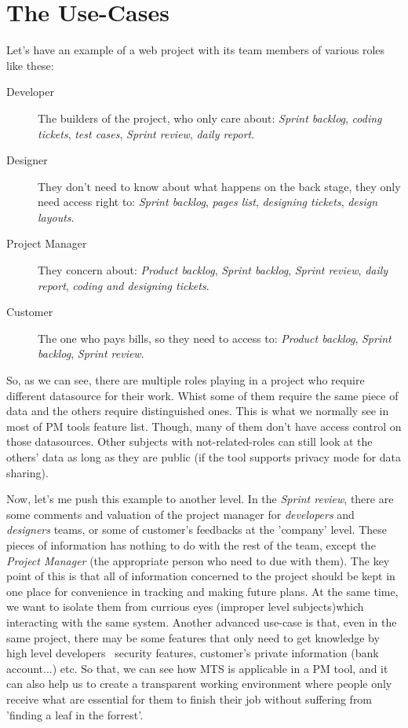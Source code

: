 
\section{The Use-Cases}
\label{ch:introduction:use_cases}
Let's have an example of a web project with its team members of various roles like these:
\begin{description}
\item[Developer] The builders of the project, who only care about: \emph{Sprint backlog}, \emph{coding tickets}, \emph{test cases}, \emph{Sprint review}, \emph{daily report}.
\item[Designer] They don't need to know about what happens on the back stage, they only need access right to: \emph{Sprint backlog}, \emph{pages list}, \emph{designing tickets}, \emph{design layouts}.
\item[Project Manager] They concern about: \emph{Product backlog}, \emph{Sprint backlog}, \emph{Sprint review}, \emph{daily report}, \emph{coding and designing tickets}.
\item[Customer] The one who pays bills, so they need to access to: \emph{Product backlog}, \emph{Sprint backlog}, \emph{Sprint review}.
\end{description}

So, as we can see, there are multiple roles playing in a project who require different datasource for their work.
Whist some of them require the same piece of data and the others require distinguished ones.
This is what we normally see in most of PM tools feature list.
Though, many of them don't have access control on those datasources.
Other subjects with not-related-roles can still look at the others' data as long as they are public (if the tool supports privacy mode for data sharing).

Now, let's me push this example to another level. In the \emph{Sprint review}, there are some comments and valuation of the project manager for \emph{developers} and \emph{designers} teams, or some of customer's feedbacks at the 'company' level.
These pieces of information has nothing to do with the rest of the team, except the \emph{Project Manager} (\ie the appropriate person who need to due with them).
The key point of this is that all of information concerned to the project should be kept in one place for convenience in tracking and making future plans.
At the same time, we want to isolate them from currious eyes (\ie improper level subjects)which interacting with the same system.
Another advanced use-case is that, even in the same project, there may be some features that only need to get knowledge by high level developers \eg\, security features, customer's private information (bank account...) etc.
So that, we can see how MTS is applicable in a PM tool, and it can also help us to create a transparent working environment where people only receive what are essential for them to finish their job without suffering from 'finding a leaf in the forrest'.

